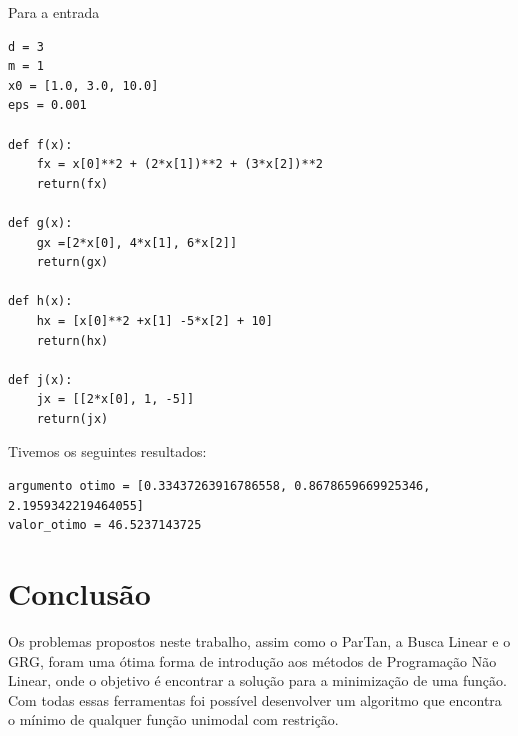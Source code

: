 \documentclass[12pt]{article}
\begin{document}
Para a entrada

\begin{verbatim}
d = 3
m = 1
x0 = [1.0, 3.0, 10.0]
eps = 0.001

def f(x):
	fx = x[0]**2 + (2*x[1])**2 + (3*x[2])**2
	return(fx)

def g(x):
	gx =[2*x[0], 4*x[1], 6*x[2]]
	return(gx)

def h(x):
	hx = [x[0]**2 +x[1] -5*x[2] + 10]
	return(hx)

def j(x):
	jx = [[2*x[0], 1, -5]]
	return(jx)
\end{verbatim}

Tivemos os seguintes resultados:

\begin{verbatim}
argumento otimo = [0.33437263916786558, 0.8678659669925346, 2.1959342219464055]
valor_otimo = 46.5237143725
\end{verbatim}


\section{Conclusão}
\mbox{}

Os problemas propostos neste trabalho, assim como o ParTan, a Busca Linear e o GRG, foram uma ótima forma de introdução aos métodos de Programação Não Linear, onde o objetivo é encontrar a solução para a minimização de uma função. Com todas essas ferramentas foi possível desenvolver um algoritmo que encontra o mínimo de qualquer função unimodal com restrição.
\end{document}
